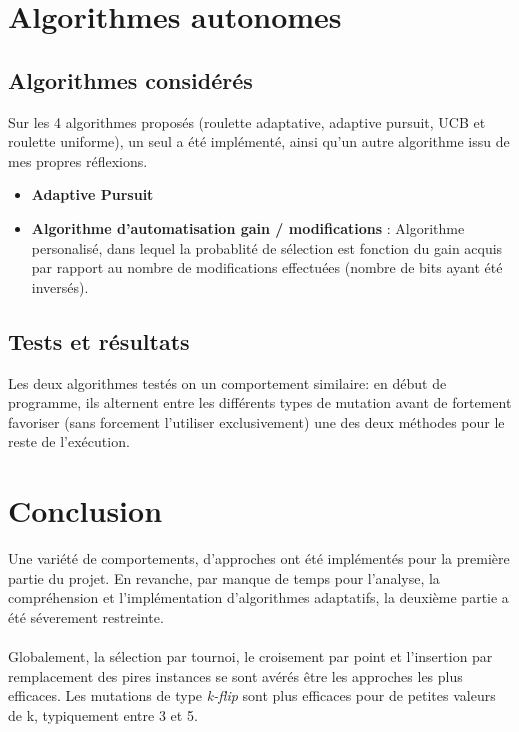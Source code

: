 \documentclass[a4paper,10pt]{report}
\begin{document}
\chapter{Algorithmes autonomes}
\section{Algorithmes considérés}
Sur les 4 algorithmes proposés (roulette adaptative, adaptive pursuit, UCB et roulette uniforme), un seul a été implémenté,
ainsi qu'un autre algorithme issu de mes propres réflexions.

\begin{itemize}
  \item \textbf{Adaptive Pursuit}
  \item \textbf{Algorithme d'automatisation gain / modifications} : Algorithme personalisé, dans lequel la probablité de sélection
	est fonction du gain acquis par rapport au nombre de modifications effectuées (nombre de bits ayant été inversés).
\end{itemize}


\section{Tests et résultats}

Les deux algorithmes testés on un comportement similaire: en début de programme, ils alternent entre les différents types de mutation
avant de fortement favoriser (sans forcement l'utiliser exclusivement) une des deux méthodes pour le reste de l'exécution.


\chapter{Conclusion}

Une variété de comportements, d'approches ont été implémentés pour la première partie du projet. En revanche, par manque de temps
pour l'analyse, la compréhension et l'implémentation d'algorithmes adaptatifs, la deuxième partie a été séverement restreinte. \\ \\

Globalement, la sélection par tournoi, le croisement par point et l'insertion par remplacement des pires instances se sont avérés
être les approches les plus efficaces. Les mutations de type \textit{k-flip} sont plus efficaces pour de petites valeurs de k,
typiquement entre 3 et 5.
\end{document}
